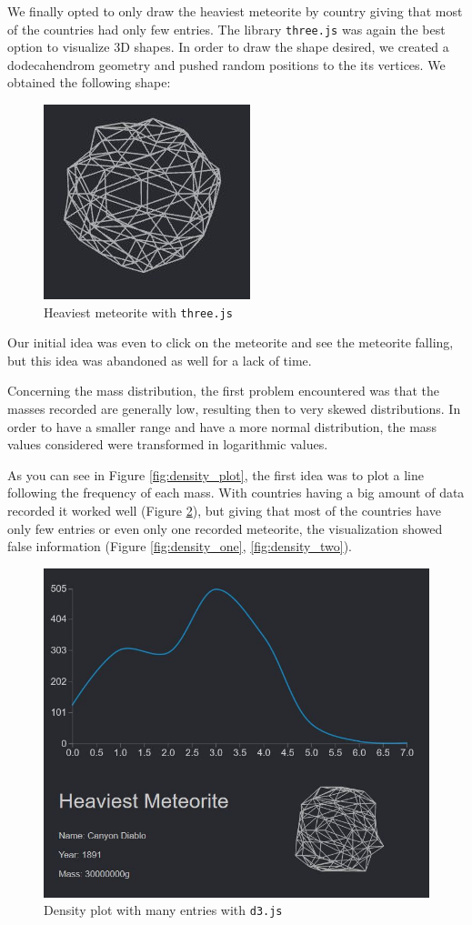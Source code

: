 \documentclass[10pt,conference,compsocconf]{IEEEtran}
\begin{document}
We finally opted to only draw the heaviest meteorite by country giving that most of the countries had only few entries. The library \texttt{three.js} was again the best option to visualize 3D shapes. In order to draw the shape desired, we created a dodecahendrom geometry and pushed random positions to the its vertices. We obtained the following shape: 

\begin{figure}[]
  \centering
  \includegraphics[width=.5\columnwidth]{images/biggestmeteorite}
  \caption{Heaviest meteorite with \texttt{three.js}}
  \label{fig:sketch_biggest}
\end{figure}

Our initial idea was even to click on the meteorite and see the meteorite falling, but this idea was abandoned as well for a lack of time.

Concerning the mass distribution, the first problem encountered was that the masses recorded are generally low, resulting then to very skewed distributions. In order to have a smaller range and have a more normal distribution, the mass values considered were transformed in logarithmic values.

As you can see in Figure \ref{fig:density_plot}, the first idea was to plot a line following the frequency of each mass. With countries having a big amount of data recorded it worked well (Figure \ref{fig:density_good}), but giving that most of the countries have only few entries or even only one recorded meteorite, the visualization showed false information (Figure \ref{fig:density_one}, \ref{fig:density_two}).

\begin{figure}[]
  \centering
  \includegraphics[width=.5\columnwidth]{images/good_density_plot}
  \caption{Density plot with many entries with \texttt{d3.js}}
  \label{fig:density_good}
\end{figure}
\end{document}
